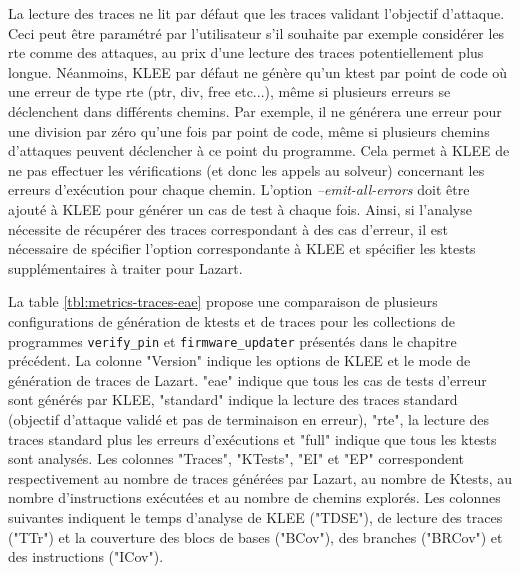             La lecture des traces ne lit par défaut que les traces validant l'objectif d'attaque. Ceci peut être paramétré par l'utilisateur s'il souhaite par exemple considérer les \gls{rte} comme des attaques, au prix d'une lecture des traces potentiellement plus longue.
            Néanmoins, KLEE par défaut ne génère qu'un ktest par point de code où une erreur de type \gls{rte} (ptr, div, free etc...), même si plusieurs erreurs se déclenchent dans différents chemins. Par exemple, il ne générera une erreur pour une division par zéro qu'une fois par point de code, même si plusieurs chemins d'attaques peuvent déclencher à ce point du programme.
            Cela permet à KLEE de ne pas effectuer les vérifications (et donc les appels au solveur) concernant les erreurs d'exécution pour chaque chemin.
            L'option \textit{--emit-all-errors} doit être ajouté à KLEE pour générer un cas de test à chaque fois.
            Ainsi, si l'analyse nécessite de récupérer des traces correspondant à des cas d'erreur, il est nécessaire de spécifier l'option correspondante à KLEE et spécifier les ktests supplémentaires à traiter pour Lazart.
            
            La table \ref{tbl:metrics-traces-eae} propose une comparaison de plusieurs configurations de génération de ktests et de traces pour les collections de programmes \texttt{verify\_pin} et \texttt{firmware\_updater} présentés dans le chapitre précédent.
            La colonne "Version" indique les options de KLEE et le mode de génération de traces de Lazart. "eae" indique que tous les cas de tests d'erreur sont générés par KLEE, "standard" indique la lecture des traces standard (objectif d'attaque validé et pas de terminaison en erreur), "rte", la lecture des traces standard plus les erreurs d'exécutions et "full" indique que tous les ktests sont analysés.
            Les colonnes "Traces", "KTests", "EI" et "EP" correspondent respectivement au nombre de traces générées par Lazart, au nombre de Ktests, au nombre d'instructions exécutées et au nombre de chemins explorés.
            Les colonnes suivantes indiquent le temps d'analyse de KLEE ("TDSE"), de lecture des traces ("TTr") et la couverture des blocs de bases ("BCov"), des branches ("BRCov") et des instructions ("ICov").
            
